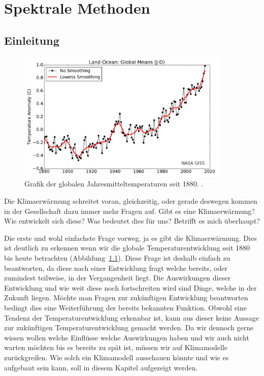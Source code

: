 \chapter{Spektrale Methoden\label{chapter:klima}}
\begin{refsection}

\section{Einleitung
\label{klima:section:einleitung}}

\begin{figure}
\centering
\includegraphics[width=0.9\textwidth]{klima/nasa_giss.pdf}
\caption{Grafik der globalen Jahresmitteltemperaturen seit 1880. \cite{klima:nasa}.
\label{klima:einleitung:nasa}}
\end{figure}

Die Klimaerwärmung schreitet voran, gleichzeitig, oder gerade deswegen kommen in der Gesellschaft dazu immer mehr Fragen auf. Gibt es eine Klimaerwärmung? Wie entwickelt sich diese? Was bedeutet dies für uns? Betrifft es mich überhaupt?

Die erste und wohl einfachste Frage vorweg, ja es gibt die Klimaerwärmung. Dies ist deutlich zu erkennen wenn wir die globale Temperaturentwicklung seit 1880 bis heute betrachten (Abbildung~\ref{klima:einleitung:nasa}). Diese Frage ist deshalb einfach zu beantworten, da diese nach einer Entwicklung fragt welche bereits, oder zumindest teilweise, in der Vergangenheit liegt. Die Auswirkungen dieser Entwicklung und wie weit diese noch fortschreiten wird sind Dinge, welche in der Zukunft liegen. Möchte man Fragen zur zukünftigen Entwicklung beantworten bedingt dies eine Weiterführung der bereits bekannten Funktion. Obwohl eine Tendenz der Temperaturentwicklung erkennbar ist, kann aus dieser keine Aussage zur zukünftigen Temperaturentwicklung gemacht werden. Da wir dennoch gerne wissen wollen welche Einflüsse welche Auswirkungen haben und wir auch nicht warten möchten bis es bereits zu spät ist, müssen wir auf Klimamodelle zurückgreifen. Wie solch ein Klimamodell ausschauen könnte und wie es aufgebaut sein kann, soll in diesem Kapitel aufgezeigt werden.


\end{refsection}
